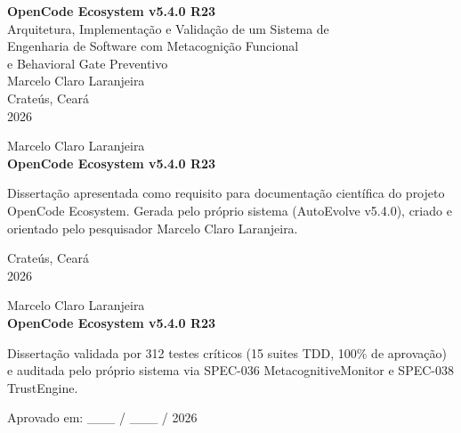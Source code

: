 \begin{capa}
    \centering
    \vspace*{4cm}
    {\ABNTEXchapterfont\Large\bfseries OpenCode Ecosystem v5.4.0 R23}\\[1cm]
    {\ABNTEXchapterfont\large Arquitetura, Implementação e Validação de um Sistema de\\Engenharia de Software com Metacognição Funcional\\e Behavioral Gate Preventivo}\\[3cm]
    {\large Marcelo Claro Laranjeira}\\[4cm]
    {\large Crateús, Ceará\\2026}
\end{capa}

\begin{folhaderosto}
    \centering
    {\ABNTEXchapterfont\Large Marcelo Claro Laranjeira}\\[1.5cm]
    {\ABNTEXchapterfont\Large\bfseries OpenCode Ecosystem v5.4.0 R23}\\[2cm]
    \begin{flushright}
    \begin{minipage}{0.5\textwidth}
    Dissertação apresentada como requisito para documentação científica do projeto OpenCode Ecosystem. Gerada pelo próprio sistema (AutoEvolve v5.4.0), criado e orientado pelo pesquisador Marcelo Claro Laranjeira.
    \end{minipage}
    \end{flushright}
    \vfill
    {\large Crateús, Ceará\\2026}
\end{folhaderosto}

\begin{folhadeaprovacao}
    \centering
    {\ABNTEXchapterfont\Large Marcelo Claro Laranjeira}\\[1cm]
    {\ABNTEXchapterfont\large\bfseries OpenCode Ecosystem v5.4.0 R23}\\[2cm]
    \begin{flushright}
    \begin{minipage}{0.5\textwidth}
    Dissertação validada por 312 testes críticos (15 suites TDD, 100\% de aprovação) e auditada pelo próprio sistema via SPEC-036 MetacognitiveMonitor e SPEC-038 TrustEngine.
    \end{minipage}
    \end{flushright}
    \vspace{1cm}
    Aprovado em: \_\_\_ / \_\_\_ / 2026
\end{folhadeaprovacao}

